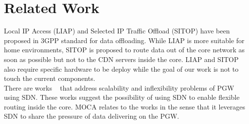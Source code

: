 \section{Related Work}

Local IP Access (LIAP) and Selected IP Traffic Offload (SITOP) have been proposed in 3GPP standard for data offloading. While LIAP is more suitable for home environments, SITOP is proposed to route data out of the core network as soon as possible but not to the CDN servers inside the core. LIAP and SITOP also require specific hardware to be deploy while the goal of our work is not to touch the current components.\\

There are works ~\cite{jin2013softcell, li2012toward} that address scalability and inflexibility problems of PGW using SDN. These works suggest the possibility of using SDN to enable flexible routing inside the core. MOCA relates to the works in the sense that it leverages SDN to share the pressure of data delivering on the PGW.\\





